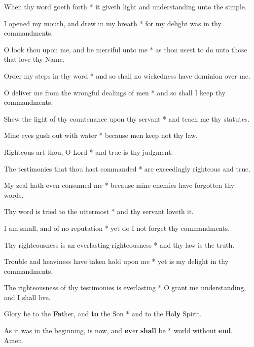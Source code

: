 \begin{multicols}{2}
	When thy word goeth forth * it giveth light and understanding unto the simple.
	
	I opened my mouth, and drew in my breath * for my delight was in thy commandments.
	
	O look thou upon me, and be merciful unto me * as thou usest to do unto those that love thy Name.
	
	Order my steps in thy word * and so shall no wickedness have dominion over me.
	
	O deliver me from the wrongful dealings of men * and so shall I keep thy commandments.
	
	Shew the light of thy countenance upon thy servant * and teach me thy statutes.
	
	Mine eyes gush out with water * because men keep not thy law.
	
	Righteous art thou, O Lord * and true is thy judgment.
	
	The testimonies that thou hast commanded * are exceedingly righteous and true.
	
	My zeal hath even consumed me * because mine enemies have forgotten thy words.
	
	Thy word is tried to the uttermost * and thy servant loveth it.
	
	I am small, and of no reputation * yet do I not forget thy commandments.
	
	Thy righteousness is an everlasting righteousness * and thy law is the truth.
	
	Trouble and heaviness have taken hold upon me * yet is my delight in thy commandments.
	
	The righteousness of thy testimonies is everlasting * O grant me understanding, and I shall live.
	
	Glory be to the \textbf{Fa}ther, and \textbf{to} the Son * and to the Ho\textbf{ly} Spirit.
	
	As it was in the beginning, is now, and \textbf{ev}er \textbf{shall} be * world without \textbf{end}. Amen.
\end{multicols}